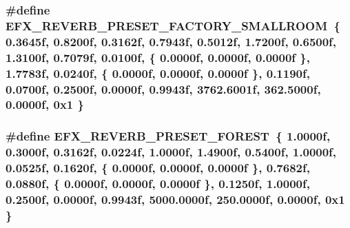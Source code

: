 \subsubsection[{\texorpdfstring{E\+F\+X\+\_\+\+R\+E\+V\+E\+R\+B\+\_\+\+P\+R\+E\+S\+E\+T\+\_\+\+F\+A\+C\+T\+O\+R\+Y\+\_\+\+S\+M\+A\+L\+L\+R\+O\+OM}{EFX_REVERB_PRESET_FACTORY_SMALLROOM}}]{\setlength{\rightskip}{0pt plus 5cm}\#define E\+F\+X\+\_\+\+R\+E\+V\+E\+R\+B\+\_\+\+P\+R\+E\+S\+E\+T\+\_\+\+F\+A\+C\+T\+O\+R\+Y\+\_\+\+S\+M\+A\+L\+L\+R\+O\+OM~\{ 0.\+3645f, 0.\+8200f, 0.\+3162f, 0.\+7943f, 0.\+5012f, 1.\+7200f, 0.\+6500f, 1.\+3100f, 0.\+7079f, 0.\+0100f, \{ 0.\+0000f, 0.\+0000f, 0.\+0000f \}, 1.\+7783f, 0.\+0240f, \{ 0.\+0000f, 0.\+0000f, 0.\+0000f \}, 0.\+1190f, 0.\+0700f, 0.\+2500f, 0.\+0000f, 0.\+9943f, 3762.\+6001f, 362.\+5000f, 0.\+0000f, 0x1 \}}\hypertarget{efx-presets_8h_a8b506e3ba97654c5fa50fe5c37b732d9}{}\label{efx-presets_8h_a8b506e3ba97654c5fa50fe5c37b732d9}
\subsubsection[{\texorpdfstring{E\+F\+X\+\_\+\+R\+E\+V\+E\+R\+B\+\_\+\+P\+R\+E\+S\+E\+T\+\_\+\+F\+O\+R\+E\+ST}{EFX_REVERB_PRESET_FOREST}}]{\setlength{\rightskip}{0pt plus 5cm}\#define E\+F\+X\+\_\+\+R\+E\+V\+E\+R\+B\+\_\+\+P\+R\+E\+S\+E\+T\+\_\+\+F\+O\+R\+E\+ST~\{ 1.\+0000f, 0.\+3000f, 0.\+3162f, 0.\+0224f, 1.\+0000f, 1.\+4900f, 0.\+5400f, 1.\+0000f, 0.\+0525f, 0.\+1620f, \{ 0.\+0000f, 0.\+0000f, 0.\+0000f \}, 0.\+7682f, 0.\+0880f, \{ 0.\+0000f, 0.\+0000f, 0.\+0000f \}, 0.\+1250f, 1.\+0000f, 0.\+2500f, 0.\+0000f, 0.\+9943f, 5000.\+0000f, 250.\+0000f, 0.\+0000f, 0x1 \}}\hypertarget{efx-presets_8h_a94d24ea2fae4d12deed381cc84f67449}{}\label{efx-presets_8h_a94d24ea2fae4d12deed381cc84f67449}
